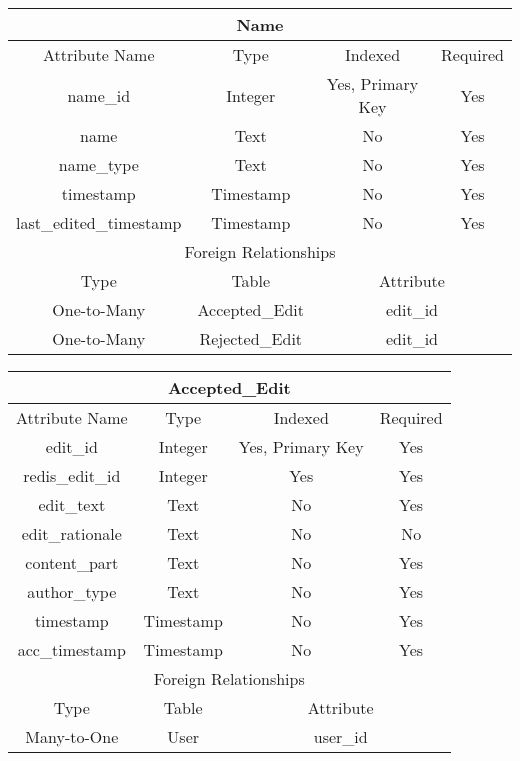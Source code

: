 \documentclass[12pt,letterpaper]{article}
\begin{document}
\vspace*{.4cm}
\begin{center}
\label{Name}
\begin{tabular}{|c|c|c|c|}
\hline
\multicolumn{4}{|c|}{Name} \\ \hline
Attribute Name & Type & Indexed & Required \\ \hline
name\_id & Integer & Yes, Primary Key & Yes \\ \hline
name & Text & No & Yes \\ \hline
name\_type & Text & No & Yes \\ \hline %
timestamp & Timestamp & No & Yes \\ \hline
last\_edited\_timestamp & Timestamp & No & Yes \\ \hline
\multicolumn{4}{|c|}{Foreign Relationships} \\ \hline
Type & Table & \multicolumn{2}{c|}{Attribute} \\ \hline
One-to-Many & Accepted\_Edit & \multicolumn{2}{c|}{edit\_id} \\ \hline %
One-to-Many & Rejected\_Edit & \multicolumn{2}{c|}{edit\_id} \\ \hline %
\end{tabular}
\end{center}


\vspace*{.6cm}
\begin{center}
\label{AcceptedEdit}
\begin{tabular}{|c|c|c|c|}
\hline
\multicolumn{4}{|c|}{Accepted\_Edit} \\ \hline
Attribute Name & Type & Indexed & Required \\ \hline
edit\_id & Integer & Yes, Primary Key & Yes \\ \hline
redis\_edit\_id & Integer & Yes & Yes \\ \hline
edit\_text & Text & No & Yes \\ \hline
edit\_rationale & Text & No & No \\ \hline
content\_part & Text & No & Yes \\ \hline
author\_type & Text & No & Yes \\ \hline %
timestamp & Timestamp & No & Yes \\ \hline
acc\_timestamp & Timestamp & No & Yes \\ \hline
\multicolumn{4}{|c|}{Foreign Relationships} \\ \hline
Type & Table & \multicolumn{2}{c|}{Attribute} \\ \hline
Many-to-One & User & \multicolumn{2}{c|}{user\_id} \\ \hline %
\end{tabular}
\end{center}
\end{document}
